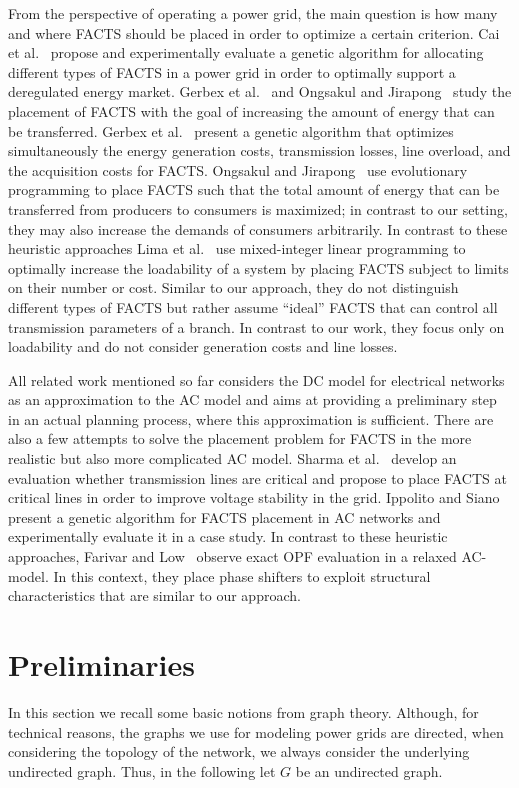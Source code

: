 \documentclass{article}[11pt,a4paper]
\begin{document}
From the perspective of operating a power grid, the main question is
how many and where FACTS should be placed in order to optimize a
certain criterion.  Cai et al.~\cite{1397562} propose and
experimentally evaluate a genetic algorithm for allocating different
types of FACTS in a power grid in order to optimally support a
deregulated energy market.  Gerbex et al.~\cite{gcg-olmtf-01} and
Ongsakul and Jirapong~\cite{1465551} study the placement of FACTS with
the goal of increasing the amount of energy that can be transferred.
Gerbex et al.~\cite{gcg-olmtf-01} present a genetic algorithm that
optimizes simultaneously the energy generation costs, transmission
losses, line overload, and the acquisition costs for FACTS.  Ongsakul
and Jirapong~\cite{1465551} use evolutionary programming to place
FACTS such that the total amount of energy that can be transferred
from producers to consumers is maximized; in contrast to our setting,
they may also increase the demands of consumers arbitrarily.
In contrast to these heuristic approaches Lima et
al.~\cite{lgkm-psp-03} use mixed-integer linear programming to
optimally increase the loadability of a system by placing FACTS
subject to limits on their number or cost.  Similar to our approach,
they do not distinguish different types of FACTS but rather assume
``ideal'' FACTS that can control all transmission parameters of a
branch.  In contrast to our work, they focus only on loadability and
do not consider generation costs and line losses.

All related work mentioned so far considers the DC model for
electrical networks as an approximation to the AC model and aims at
providing a preliminary step in an actual planning process, where this
approximation is sufficient.  There are also a few attempts to solve
the placement problem for FACTS in the more realistic but also more
complicated AC model.  
Sharma et al.~\cite{sgv-nps-03} develop an
evaluation whether transmission lines are critical and propose to
place FACTS at critical lines in order to improve voltage stability in
the grid.  Ippolito and Siano~\cite{is-sonl-04} present a genetic
algorithm for FACTS placement in AC networks and experimentally
evaluate it in a case study.
In contrast to these heuristic approaches, Farivar and Low~\cite{6507352} 
observe exact OPF evaluation in a relaxed AC-model. In this context, they 
place phase shifters to exploit structural characteristics that are similar to our approach.
\section{Preliminaries}
\label{sec:preliminaries}
In this section we recall some basic notions from graph theory.
Although, for technical reasons, the graphs we use for modeling power
grids are directed, when considering the topology of the network, we
always consider the underlying undirected graph.  Thus, in the
following let $G$ be an undirected graph.
\end{document}
